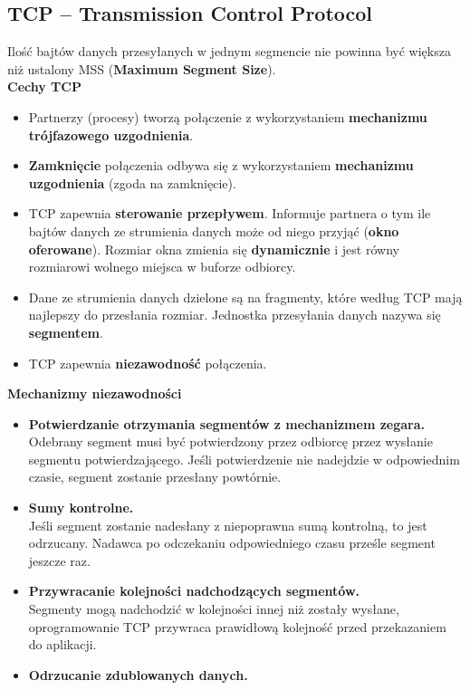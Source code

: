 \documentclass[../main.tex]{subfiles}
\begin{document}
    \subsection{TCP – Transmission Control Protocol}
    Ilość bajtów danych przesyłanych w jednym segmencie nie powinna być większa niż ustalony MSS (\textbf{Maximum Segment Size}).\\

    \textbf{Cechy TCP}
    \begin{itemize}
        \item Partnerzy (procesy) tworzą połączenie z wykorzystaniem \textbf{mechanizmu trójfazowego uzgodnienia}.
        \item\textbf{Zamknięcie} połączenia odbywa się z wykorzystaniem \textbf{mechanizmu uzgodnienia} (zgoda na zamknięcie).
        \item TCP zapewnia \textbf{sterowanie przepływem}. Informuje partnera o tym ile bajtów danych ze strumienia danych może od niego przyjąć (\textbf{okno oferowane}). Rozmiar okna zmienia się \textbf{dynamicznie} i jest równy rozmiarowi wolnego miejsca w buforze odbiorcy.
        \item Dane ze strumienia danych dzielone są na fragmenty, które według TCP mają najlepszy
        do przesłania rozmiar. Jednostka przesyłania danych nazywa się \textbf{segmentem}.
        \item TCP zapewnia \textbf{niezawodność} połączenia.
    \end{itemize}

    \textbf{Mechanizmy niezawodności}
    \begin{itemize}
        \item \textbf{Potwierdzanie otrzymania segmentów z mechanizmem zegara.}\\
        Odebrany segment musi być potwierdzony przez odbiorcę przez wysłanie segmentu potwierdzającego. Jeśli
        potwierdzenie nie nadejdzie w odpowiednim czasie, segment zostanie przesłany powtórnie.
        \item \textbf{Sumy kontrolne.}\\
        Jeśli segment zostanie nadesłany z niepoprawna sumą kontrolną, to jest
        odrzucany. Nadawca po odczekaniu odpowiedniego czasu prześle segment jeszcze raz.
        \item \textbf{Przywracanie kolejności nadchodzących segmentów.}\\
        Segmenty mogą nadchodzić w kolejności innej niż zostały wysłane, oprogramowanie TCP przywraca prawidłową kolejność przed przekazaniem do aplikacji.
        \item \textbf{Odrzucanie zdublowanych danych.}
    \end{itemize}
\end{document}
